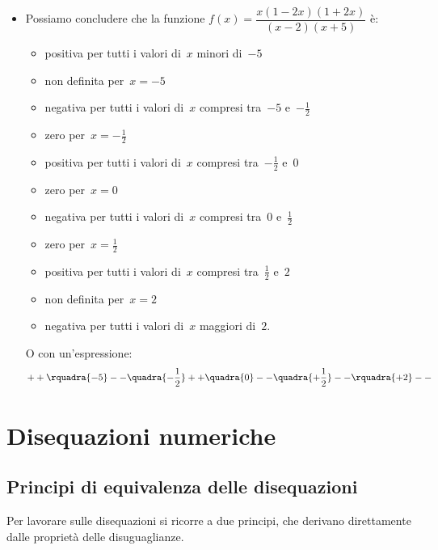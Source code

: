 \begin{esempio}{}{}
\begin{itemize} [noitemsep, left=0mm]
\segnomista
\item Possiamo concludere che la funzione
\(f(x)=\dfrac{x(1 -2 x)(1 + 2 x)}{(x -2)(x +5)}\) è:
\begin{itemize} [noitemsep]
\item positiva per tutti i valori di~\(x\) minori di~\(-5\)
\item non definita per~\(x=-5\)
\item negativa per tutti i valori di~\(x\) compresi tra~\(-5\) 
e~\(-\frac{1}{2}\)
\item zero per~\(x=-\frac{1}{2}\)
\item positiva per tutti i valori di~\(x\) compresi tra~\(-\frac{1}{2}\) 
e~\(0\)
\item zero per~\(x=0\)
\item negativa per tutti i valori di~\(x\) compresi tra~\(0\) 
e~\(\frac{1}{2}\)
\item zero per~\(x=\frac{1}{2}\)
\item positiva per tutti i valori di~\(x\) compresi tra~\(\frac{1}{2}\) 
e~\(2\)
\item non definita per~\(x=2\)
\item negativa per tutti i valori di~\(x\) maggiori di~\(2\).
\end{itemize}
O con un'espressione:
\[++\rquadra{-5}--\quadra{-\dfrac{1}{2}}++\quadra{0}
  --\quadra{+\dfrac{1}{2}}--\rquadra{+2}--\]
\end{itemize}
\end{esempio}

% 

\section{Disequazioni numeriche}
\label{sec:dis_numeriche}

\subsection{Principi di equivalenza delle disequazioni}
Per lavorare sulle disequazioni si ricorre a due principi, che derivano 
direttamente dalle proprietà delle disuguaglianze.

